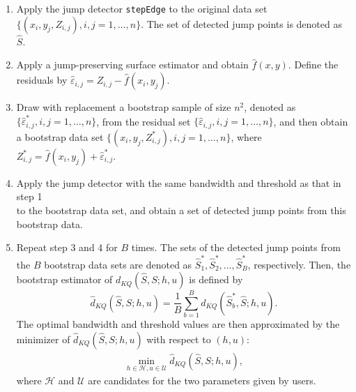 \begin{enumerate}
\def\labelenumi{\arabic{enumi}.}
\tightlist
\item
  Apply the jump detector \texttt{stepEdge} to the original data set \(\{(x_i,y_j,Z_{i,j}),
     i,j = 1, \ldots, n\}\). The set of detected jump points is denoted as
  \(\widehat{S}\).
\item
  Apply a jump-preserving surface estimator and obtain \(\widehat{f}(x,y)\). Define
  the residuals by \(\widehat{\varepsilon}_{i, j} = Z_{i, j} - \widehat{f}(x_i, y_j)\).
\item
  Draw with replacement a bootstrap sample of size \(n^2\), denoted as
  \(\{\widehat{\varepsilon}^*_{i, j}, i, j = 1, \ldots, n\}\), from the residual set
  \(\{\widehat{\varepsilon}_{i, j}, i, j = 1, \ldots, n\}\), and then obtain a bootstrap data set
  \(\{(x_i, y_j, Z^*_{i, j}), i, j = 1, \ldots, n\}\), where \(Z^*_{i, j} = \widehat{f}(x_i, y_j) +
     \widehat{\varepsilon}^*_{i, j}\).
\item
  Apply the jump detector with the same bandwidth and threshold as that in step 1\\
  to the bootstrap data set, and obtain a set of detected jump points from this bootstrap
  data.
\item
  Repeat step 3 and 4 for \(B\) times. The sets of the detected
  jump points from the \(B\) bootstrap data sets are denoted as
  \(\widehat{S}^*_{1}, \widehat{S}^*_{2}, \ldots,\widehat{S}^*_{B}\), respectively.
  Then, the bootstrap
  estimator of \(d_{KQ}(\widehat{S}, S; h, u)\) is defined by
  \[
         \widehat{d}_{KQ}(\widehat{S},S; h, u)=
         \frac{1}{B}\sum_{b=1}^B d_{KQ}(\widehat{S}^*_{b},\widehat{S}; h, u).
     \]
  The optimal bandwidth and threshold values are then approximated by the minimizer of
  \(\widehat{d}_{KQ}(\widehat{S}, S; h, u)\) with respect to \((h, u)\):
  \begin{align*}
       \min_{h \in \mathscr{H}, u \in \mathscr{U}} \widehat{d}_{KQ}(\widehat{S}, S; h, u),
     \end{align*}
  where \(\mathscr{H}\) and \(\mathscr{U}\) are candidates for the two parameters given by users.
\end{enumerate}


